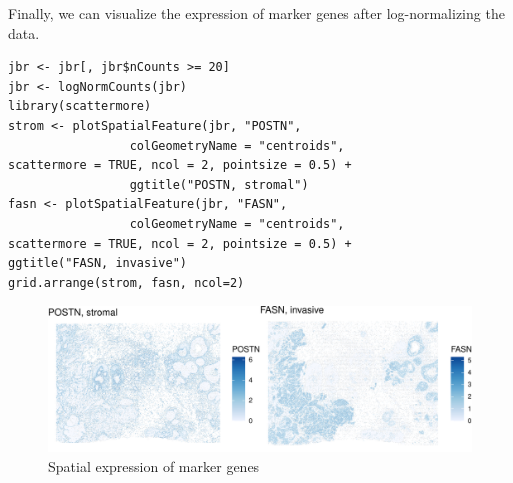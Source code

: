 \documentclass[graybox]{svmult}
\begin{document}
Finally, we can visualize the expression of marker genes after log-normalizing
the data.

\begin{shaded}
\begin{verbatim}
jbr <- jbr[, jbr$nCounts >= 20]
jbr <- logNormCounts(jbr)
library(scattermore)
strom <- plotSpatialFeature(jbr, "POSTN", 
                 colGeometryName = "centroids",
scattermore = TRUE, ncol = 2, pointsize = 0.5) + 
                 ggtitle("POSTN, stromal")
fasn <- plotSpatialFeature(jbr, "FASN", 
                 colGeometryName = "centroids",
scattermore = TRUE, ncol = 2, pointsize = 0.5) +
ggtitle("FASN, invasive")
grid.arrange(strom, fasn, ncol=2)
\end{verbatim}
\end{shaded}

%
%

\begin{figure}
\includegraphics[width=1\linewidth,]{spatpdfs/sfemark-1} \caption{Spatial expression of marker genes}\label{fig:sfemark}
\end{figure}
\end{document}
